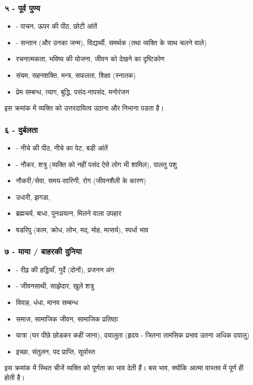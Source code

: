 \subsubsection{५ - पूर्व पुण्य}
\begin{itemize}
    \item {} - पाचन, ऊपर की पीठ, छोटी आंतें
    \item {} - सन्तान (और उनका जन्म), विद्यार्थी, समर्थक (तथा व्यक्ति के साथ चलने वाले)
    \item रचनात्मकता, भविष्य की योजना, जीवन को देखने का दृष्टिकोण
    \item संयम, सहनशक्ति, मन्त्र, सफलता, शिक्षा (स्नातक)
    \item प्रेम सम्बन्ध, त्याग, बुद्धि, पसंद-नापसंद, मनोरंजन
\end{itemize}
इस क्रमांक में व्यक्ति को उत्तरदायित्व उठाना और निभाना पडता है।
\subsubsection{६ - दुर्बलता}
\begin{itemize}
    \item {} - नीचे की पीठ, नीचे का पेट, बडी आंतें
    \item {} - नौकर, शत्रु (व्यक्ति को नहीं पसंद ऐसे लोग भी शामिल), पालतु पशु
    \item नौकरी/सेवा, समय-सारिणी, रोग (जीवनशैली के कारण)
    \item उधारी, झगडा, 
    \item ब्रह्मचर्य, बाधा, पुनःप्रयत्न, मिलने वाला उपहार
    \item षडरिपु (काम, क्रोध, लोभ, मद्, मोह, मत्सर्य), स्पर्धा भाव
\end{itemize}
\subsubsection{७ - माया / बाहरकी दुनिया}
\begin{itemize}
    \item {} - रीढ़ की हड्डियाँ, गुर्दे (दोनों), प्रजनन अंग
    \item {} - जीवनसाथी, साझेदार, खुले शत्रु
    \item विवाह, धंधा, मानव सम्बन्ध
    \item समाज, सामाजिक जीवन, सामाजिक प्रतिष्ठा
    \item यात्रा (घर पीछे छोडकर कहीं जाना), दयालुता (हृदय - जितना तामसिक प्रभाव उतना अधिक दयालु)
    \item इच्छा, संतुलन, पद प्राप्ति, सूर्यास्त
\end{itemize}
इस क्रमांक में स्थित चीजें व्यक्ति को पूर्णता का भाव देती हैं। बस भाव, क्योंकि आत्मा वास्तव में पूर्ण ही होती है।
